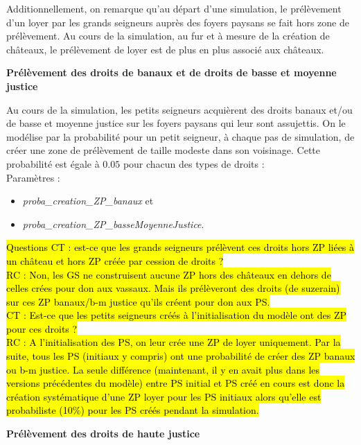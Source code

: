 \documentclass[a4paper,11pt]{article}
\newcommand{\hlc}[2][yellow]{ {\sethlcolor{#1} \hl{#2}} }
\begin{document}
{Additionnellement, on remarque qu'au départ d'une simulation, le prélèvement d'un loyer par les grands seigneurs auprès des foyers paysans se fait hors zone de prélèvement. Au cours de la simulation, au fur et à mesure de la création de châteaux, le prélèvement de loyer est de plus en plus associé aux châteaux.

\bigskip
\textbf{Prélèvement des droits de banaux et de droits de basse et moyenne justice}

Au cours de la simulation, les petits seigneurs acquièrent des droits banaux et/ou de basse et moyenne justice sur les foyers paysans qui leur sont assujettis. On le modélise par la probabilité pour un petit seigneur, à chaque pas de simulation, de créer une zone de prélèvement de taille modeste dans son voisinage. Cette probabilité est égale à $0.05$ pour chacun des types de droits :\\
Paramètres :
\begin{itemize}
\item \textit{proba\_creation\_ZP\_banaux} et
\item \textit{proba\_creation\_ZP\_basseMoyenneJustice}.
\end{itemize}

\hlc[fluorescentorange]{Questions CT : est-ce que les grands seigneurs prélèvent ces droits hors ZP liées à un château et hors ZP créée par cession de droits ?\\
RC : Non, les GS ne construisent aucune ZP hors des châteaux en dehors de celles crées pour don aux vassaux. Mais ils prélèveront des droits (de suzerain) sur ces ZP banaux/b-m justice qu'ils créent pour don aux PS.\\
CT : Est-ce que les petits seigneurs créés à l'initialisation du modèle ont des ZP pour ces droits ?\\
RC : A l'initialisation des PS, on leur crée une ZP de loyer uniquement. Par la suite, tous les PS (initiaux y compris) ont une probabilité de créer des ZP banaux ou b-m justice.
La seule différence (maintenant, il y en avait plus dans les versions précédentes du modèle) entre PS initial et PS créé en cours est donc la création systématique d'une ZP loyer pour les PS initiaux alors qu'elle est probabiliste (10\%) pour les PS créés pendant la simulation.
}

\bigskip
\textbf{Prélèvement des droits de haute justice}

}
\end{document}
